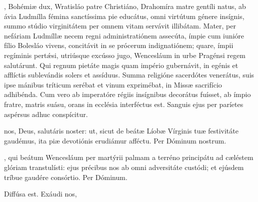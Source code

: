 \documentclass[fontsize=9pt,paper=A6,twoside,BCOR=1mm,DIV=22,headinclude]{scrarticle}
\begin{document}
\begin{multicols}{2}

\columnbreak
{
, Bohémiæ dux, Wratisláo patre Christiáno, Drahomíra matre gentíli natus, ab ávia Ludmílla fémina sanctíssima pie educátus, omni virtútum génere insígnis, summo stúdio virginitátem per omnem vitam servávit illibátam. Mater, per nefáriam Ludmíllæ necem regni administratiónem assecúta, ímpie cum iunióre fílio Bolesláo vivens, concitávit in se prócerum indignatiónem; quare, ímpii regíminis pertǽsi, utriúsque excússo jugo, Wencesláum in urbe Pragénsi regem salutárunt. Qui regnum pietáte magis quam império gubernávit, in egénis et afflíctis sublevándis solers et assíduus. Summa religióne sacerdótes venerátus, suis ipse mánibus tríticum serébat et vinum exprimébat, in Missæ sacrifício adhibénda. Cum vero ab imperatóre régiis insígnibus decorátus fuísset, ab ímpio fratre, matris suásu, orans in ecclésia interféctus est. Sanguis ejus per paríetes aspérsus adhuc conspícitur.

\Te


\VRVii 

\BV 

 nos, Deus, salutáris noster: ut, sicut de beátæ Líobæ Vírginis tuæ festivitáte gaudémus, ita piæ devotiónis erudiámur afféctu. Per Dóminum nostrum.

}


\AiiM

\VRMii 

, qui beátum Wencesláum per martýrii palmam a terréno principátu ad cæléstem glóriam transtulísti: ejus précibus nos ab omni adversitáte custódi; et ejúsdem tríbue gaudére consórtio. Per Dóminum.


\AiiiV 

\V Diffúsa est.  Exáudi nos, 






\end{multicols}
\end{document}
